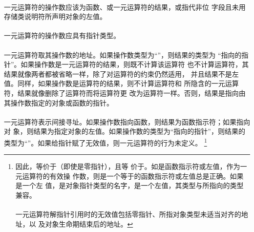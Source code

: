 {

\constraint
\paragraph{}
一元运算符\tm{\&}的操作数应该为函数、\tm{[]}或一元\tm{*}运算符的结果，或指代非位
字段且未用存储类说明符所声明对象的左值。

\paragraph{}
一元\tm{*}运算符的操作数应具有指针类型。

\semantic
\paragraph{}
一元运算符\tm{\&}取其操作数的地址。如果操作数类型为``''，则结果的类型为
``指向的指针''。如果操作数是一元\tm{*}运算符的结果，则既不计算该运算符
也不计算\tm{\&}运算符，其结果就像两者都被省略一样，除了对运算符的约束仍然适用，
并且结果不是左值。同样，如果操作数是\tm{[]}运算符的结果，则不计算\tm{\&}运算符和
\tm{[]}所隐含的一元\tm{*}运算符，结果就像删除了\tm{\&}运算符而将\tm{[]}运算符更
改为\tm{+}运算符一样。否则，结果是指向由其操作数指定的对象或函数的指针。

\paragraph{}
一元\tm{*}运算符表示间接寻址。如果操作数指向函数，则结果为函数指示符；如果指向对
象，则结果为指定对象的左值。如果操作数的类型为``指向的指针''，则结果的
类型为``''。如果给指针赋了无效值，则一元\tm{*}运算符的行为未定义。
\footnote{因此，等价于（即使是零指针），且等
价于。如是函数指示符或左值，作为一元\tm{\&}运算符的有效操
作数，则是一个等于的函数指示符或左值总是正确。如果是一个左
值，是对象指针类型的名字，是一个左值，其类型与所指向的类型
兼容。                                                                        \\
                                                                              \\
一元\tm{*}运算符解指针引用时的无效值包括零指针、所指对象类型未适当对齐的地址，以
及对象生命期结束后的地址。}


}
